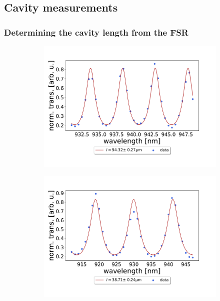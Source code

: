 \subsection{Cavity measurements}\label{sec:cavity_measurements}

\subsubsection{Determining the cavity length from the FSR}

\begin{figure}[h!]
    \centering
    \begin{subfigure}[b]{0.49\textwidth}
        \includegraphics[width=\textwidth]{figures/length_from_fsr_example_100um.pdf}
        \caption{}
        \label{fig:100um_FSR}
    \end{subfigure}
    \begin{subfigure}[b]{0.49\textwidth}
        \includegraphics[width=\textwidth]{figures/length_from_fsr_example_40um.pdf}
        \caption{}
        \label{fig:40um_FSR}
    \end{subfigure}
    \caption{}
    \label{fig:length_from_long_scan_example}    
\end{figure}

